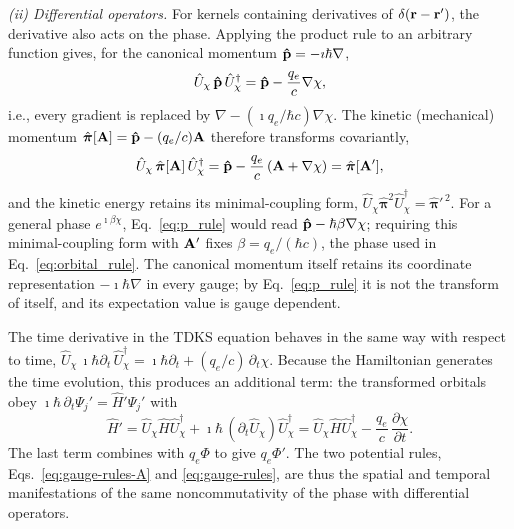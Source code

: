 \emph{(ii) Differential operators.} For kernels containing derivatives of
$\delta(\vb{r}-\vb{r}')$, the derivative also acts on the phase. Applying the
product rule to an arbitrary function gives, for the canonical momentum
$\vb{\hat p}=-\imath\hbar\nabla$,
\begin{equation}
  \hat U_\chi\,\vb{\hat p}\,\hat U_\chi^\dagger
  = \vb{\hat p} - \frac{q_e}{c}\nabla\chi ,
  \label{eq:p_rule}
\end{equation}
i.e., every gradient is replaced by $\nabla-(\imath q_e/\hbar c)\nabla\chi$.
The kinetic (mechanical) momentum
$\hat{\boldsymbol{\pi}}[\vb{A}] = \vb{\hat p} - (q_e/c)\vb{A}$
therefore transforms covariantly,
\begin{equation}
  \hat U_\chi\,\hat{\boldsymbol{\pi}}[\vb{A}]\,\hat U_\chi^\dagger
  = \vb{\hat p} - \frac{q_e}{c}\left(\vb{A}+\nabla\chi\right)
  = \hat{\boldsymbol{\pi}}[\vb{A}'] ,
  \label{eq:pi_rule}
\end{equation}
and the kinetic energy retains its minimal-coupling form,
$\hat U_\chi\hat{\boldsymbol{\pi}}^2\hat U_\chi^\dagger = \hat{\boldsymbol{\pi}}'^{\,2}$.
For a general phase $e^{\imath\beta\chi}$, Eq.~\eqref{eq:p_rule} would read
$\vb{\hat p}-\hbar\beta\nabla\chi$; requiring this minimal-coupling form with
$\vb{A}'$ fixes $\beta = q_e/(\hbar c)$, the phase used in
Eq.~\eqref{eq:orbital_rule}. The canonical momentum itself retains its
coordinate representation $-\imath\hbar\nabla$ in every gauge; by
Eq.~\eqref{eq:p_rule} it is not the transform of itself, and its expectation
value is gauge dependent.

The time derivative in the TDKS equation behaves in the same way with respect
to time, $\hat U_\chi\,\imath\hbar\partial_t\,\hat U_\chi^\dagger
= \imath\hbar\partial_t + (q_e/c)\,\partial_t\chi$. Because the Hamiltonian
generates the time evolution, this produces an additional term: the
transformed orbitals obey $\imath\hbar\,\partial_t\Psi_j' = \hat H'\Psi_j'$ with
\begin{equation}
  \hat H' = \hat U_\chi\hat H\hat U_\chi^\dagger
          + \imath\hbar\,(\partial_t\hat U_\chi)\hat U_\chi^\dagger
          = \hat U_\chi\hat H\hat U_\chi^\dagger - \frac{q_e}{c}\,\frac{\partial\chi}{\partial t}.
  \label{eq:H_rule}
\end{equation}
The last term combines with $q_e\Phi$ to give $q_e\Phi'$. The two potential
rules, Eqs.~\eqref{eq:gauge-rules-A} and \eqref{eq:gauge-rules}, are thus the
spatial and temporal manifestations of the same noncommutativity of the phase
with differential operators.

